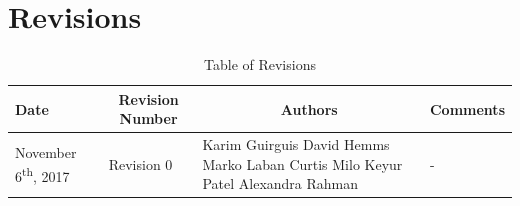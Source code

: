 \documentclass [11pt]{article}
\begin{document}

\pagebreak


\tableofcontents
\listoftables
\listoffigures



\pagebreak


\section{Revisions}

\begin{longtable}{| p{ } | p{ } | p{ } | p{ } |}\caption{Table of Revisions}  \\

\hline 
\centering \textbf{Date} & 
\multicolumn{1}{c}{\textbf {Revision Number}} &
\multicolumn{1}{|c}{\textbf {Authors}} & 
\multicolumn{1}{|c|}{\textbf {Comments}} \\ \hline

\multirow{4}{*}{\centering November 6\textsuperscript{th}, 2017}  & 
\multirow{4}{*}{Revision 0}& 
		{Karim Guirguis \newline
		David Hemms \newline
		Marko Laban \newline
		Curtis Milo \newline
		Keyur Patel \newline
		Alexandra Rahman} &
 \multirow{4}{*}{-} \\ 
\hline 
\end{longtable}



\pagebreak

\end{document}
